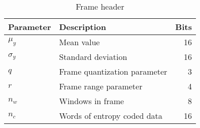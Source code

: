 \begin{table}[ht]
\footnotesize
\centering
\caption{Frame header}
\begin{tabular}{llr}
\toprule
Parameter & Description & Bits \\
\midrule

$\mu_y$ & Mean value & 16\\
$\sigma_y$ & Standard deviation & 16 \\
$q$ &  Frame quantization parameter & 3\\
$r$ &  Frame range parameter & 4 \\
$n_w$ & Windows in frame & 8 \\
$n_c$ & Words of entropy coded data& 16 \\
\bottomrule
\end{tabular}
\label{tbl:header:frame}
\end{table}
